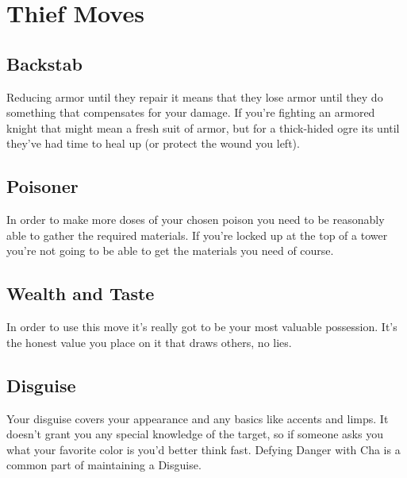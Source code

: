 \chapter{Thief Moves}
   
 
\section{Backstab}   
 

Reducing armor until they repair it means that they lose armor until they do something that compensates for your damage. If you're fighting an armored knight that might mean a fresh suit of armor, but for a thick-hided ogre its until they've had time to heal up (or protect the wound you left).

 
\section{Poisoner}   
 

In order to make more doses of your chosen poison you need to be reasonably able to gather the required materials. If you're locked up at the top of a tower you're not going to be able to get the materials you need of course.

 
\section{Wealth and Taste}    
 

In order to use this move it's really got to be your most valuable possession. It's the honest value you place on it that draws others, no lies.

 
\section{Disguise}   
 

Your disguise covers your appearance and any basics like accents and limps. It doesn't grant you any special knowledge of the target, so if someone asks you what your favorite color is you'd better think fast. Defying Danger with Cha is a common part of maintaining a Disguise.

 
